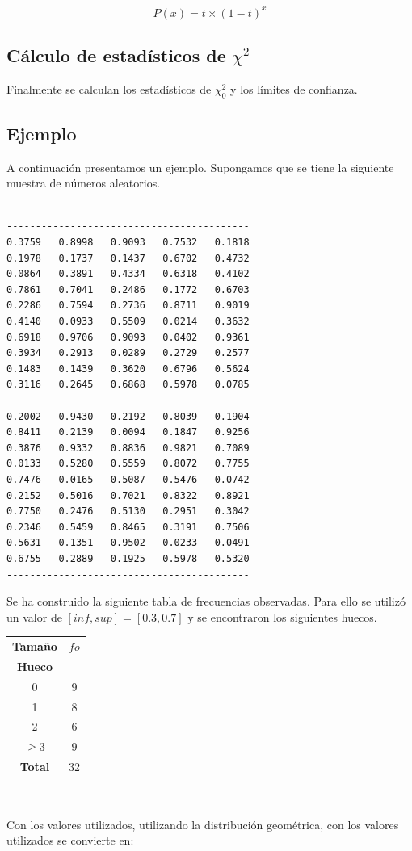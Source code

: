 $$P(x) = t\times (1-t)^x$$

\subsection{Cálculo de estadísticos de $\chi^2$}
Finalmente se calculan los estadísticos de $\chi^2_0$ y los límites de confianza.

\subsection{Ejemplo}
A continuación presentamos un ejemplo. Supongamos que se tiene la siguiente muestra de números aleatorios.
\begin{verbatim}

------------------------------------------
0.3759   0.8998   0.9093   0.7532   0.1818
0.1978   0.1737   0.1437   0.6702   0.4732
0.0864   0.3891   0.4334   0.6318   0.4102
0.7861   0.7041   0.2486   0.1772   0.6703
0.2286   0.7594   0.2736   0.8711   0.9019
0.4140   0.0933   0.5509   0.0214   0.3632
0.6918   0.9706   0.9093   0.0402   0.9361
0.3934   0.2913   0.0289   0.2729   0.2577
0.1483   0.1439   0.3620   0.6796   0.5624
0.3116   0.2645   0.6868   0.5978   0.0785

0.2002   0.9430   0.2192   0.8039   0.1904
0.8411   0.2139   0.0094   0.1847   0.9256
0.3876   0.9332   0.8836   0.9821   0.7089
0.0133   0.5280   0.5559   0.8072   0.7755
0.7476   0.0165   0.5087   0.5476   0.0742
0.2152   0.5016   0.7021   0.8322   0.8921
0.7750   0.2476   0.5130   0.2951   0.3042
0.2346   0.5459   0.8465   0.3191   0.7506
0.5631   0.1351   0.9502   0.0233   0.0491
0.6755   0.2889   0.1925   0.5978   0.5320
------------------------------------------
\end{verbatim}

Se ha construido la siguiente tabla de frecuencias observadas. Para ello se utilizó un valor de $[inf,sup] = [0.3,0.7]$ y se encontraron los siguientes huecos.\\
\begin{center}
    
\begin{tabular}{|c|c|}
        \hline
        \textbf{Tamaño} & \textbf{$fo$} \\
        \textbf{Hueco} &\\ \hline
        0 & 9 \\ \hline
        1 & 8 \\ \hline
        2 & 6 \\ \hline
        $\geq 3$ & 9 \\ \hline
        \textbf{Total} & 32 \\ \hline
\end{tabular}\\

\end{center}
Con los valores utilizados, utilizando la distribución geométrica, con los valores utilizados se convierte en:


